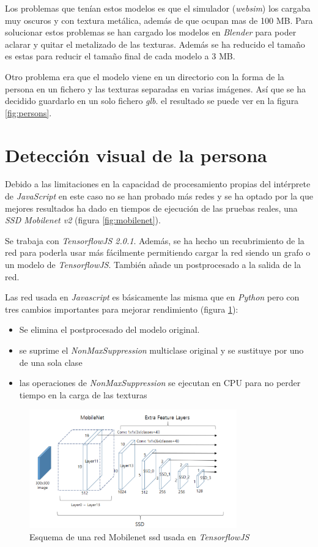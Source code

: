 Los problemas que tenían estos modelos es que el simulador (\textit{websim}) los cargaba muy oscuros y con textura metálica, además de que ocupan mas de 100 MB. Para solucionar estos problemas se han cargado los modelos en \textit{Blender} para poder aclarar y quitar el metalizado de las texturas. Además se ha reducido el tamaño es estas para reducir el tamaño final de cada modelo a 3 MB.

Otro problema era que el modelo viene en un directorio con la forma de la persona en un fichero y las texturas separadas en varias imágenes. Así que se ha decidido guardarlo en un solo fichero \textit{\acrfull{glb}}. el resultado se puede ver en la figura \ref{fig:persons}.

\section{Detección visual de la persona}
Debido a las limitaciones en la capacidad de procesamiento propias del intérprete de \textit{JavaScript} en este caso no se han probado más redes y se ha optado por la que mejores resultados ha dado en tiempos de ejecución de las pruebas reales, una \textit{SSD  Mobilenet  v2} (figura \ref{fig:mobilenet}).

Se trabaja con \textit{TensorflowJS  2.0.1}. Además, se ha hecho un recubrimiento de la red para poderla usar más fácilmente permitiendo cargar la red siendo un grafo o un modelo de \textit{TensorflowJS}. También añade un postprocesado a la salida de la red.

Las red usada en \textit{Javascript} es básicamente las misma que en \textit{Python} pero con tres cambios importantes para mejorar rendimiento (figura \ref{fig:mobilenet2}):
\begin{itemize}
  \item Se elimina el postprocesado del modelo original.
  \item se suprime el \textit{NonMaxSuppression} multiclase original y se sustituye por uno de una sola clase
  \item las operaciones de \textit{NonMaxSuppression} se ejecutan en CPU para no perder tiempo en la carga de las texturas
\end{itemize}
\begin{figure}[H]
  \begin{center}
    \includegraphics[width=0.8\textwidth]{figures/simulado/mobilenet.png}
		\caption{Esquema de una red Mobilenet ssd usada en \textit{TensorflowJS}}
		\label{fig:mobilenet2}
		\end{center}
\end{figure}


